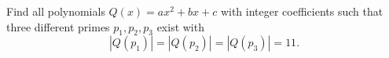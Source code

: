 Find all polynomials $Q(x)=ax^2+bx+c$ with integer coefficients such that
three different primes $p_1,p_2,p_3$ exist with
$$|Q(p_1)|=|Q(p_2)|=|Q(p_3)|=11.$$